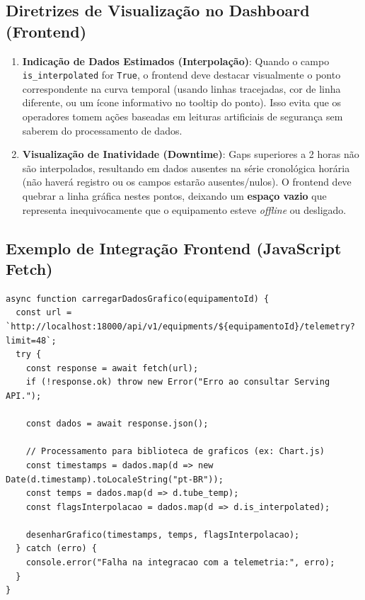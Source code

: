\documentclass[12pt,a4paper]{article}
\begin{document}
\subsection{Diretrizes de Visualização no Dashboard (Frontend)}
\begin{enumerate}
    \item \textbf{Indicação de Dados Estimados (Interpolação)}: Quando o campo \texttt{is\_interpolated} for \texttt{True}, o frontend deve destacar visualmente o ponto correspondente na curva temporal (usando linhas tracejadas, cor de linha diferente, ou um ícone informativo no tooltip do ponto). Isso evita que os operadores tomem ações baseadas em leituras artificiais de segurança sem saberem do processamento de dados.
    \item \textbf{Visualização de Inatividade (Downtime)}: Gaps superiores a 2 horas não são interpolados, resultando em dados ausentes na série cronológica horária (não haverá registro ou os campos estarão ausentes/nulos). O frontend deve quebrar a linha gráfica nestes pontos, deixando um \textbf{espaço vazio} que representa inequivocamente que o equipamento esteve \textit{offline} ou desligado.
\end{enumerate}

\subsection{Exemplo de Integração Frontend (JavaScript Fetch)}
\begin{lstlisting}[caption=Implementação no Dashboard Client]
async function carregarDadosGrafico(equipamentoId) {
  const url = `http://localhost:18000/api/v1/equipments/${equipamentoId}/telemetry?limit=48`;
  try {
    const response = await fetch(url);
    if (!response.ok) throw new Error("Erro ao consultar Serving API.");
    
    const dados = await response.json();
    
    // Processamento para biblioteca de graficos (ex: Chart.js)
    const timestamps = dados.map(d => new Date(d.timestamp).toLocaleString("pt-BR"));
    const temps = dados.map(d => d.tube_temp);
    const flagsInterpolacao = dados.map(d => d.is_interpolated);
    
    desenharGrafico(timestamps, temps, flagsInterpolacao);
  } catch (erro) {
    console.error("Falha na integracao com a telemetria:", erro);
  }
}
\end{lstlisting}

\newpage
\end{document}
